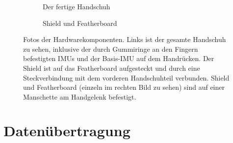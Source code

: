 \begin{figure}
    \begin{subfigure}[b]{0.59\textwidth}
        \centering
        \caption{Der fertige Handschuh}
    \end{subfigure}
    \hfill
    \begin{subfigure}[b]{0.4\textwidth}
        \centering
        \caption{Shield und Featherboard}
    \end{subfigure}

    \caption[Fotos der Hardwarekomponenten]{Fotos der Hardwarekomponenten.
    Links ist der gesamte Handschuh zu sehen, inklusive der durch Gummiringe an
    den Fingern befestigten IMUs und der Basis-IMU auf dem Handrücken. Der
    Shield ist auf das Featherboard aufgesteckt und durch eine Steckverbindung
    mit dem vorderen Handschuhteil verbunden. Shield und Featherboard (einzeln
    im rechten Bild zu sehen) sind auf einer Manschette am Handgelenk
    befestigt.}
\end{figure}

\section{Datenübertragung} 


